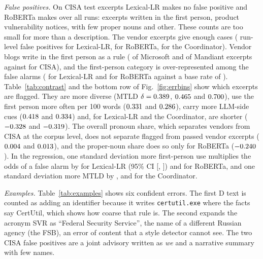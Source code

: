 \documentclass[journal]{IEEEtran}
\begin{document}
\emph{False positives.} On CISA test excerpts Lexical-LR makes no false positive and RoBERTa makes
\ErrtotalFpCisaTrans{} over all runs: \ErrNFpCisaFirstPersonTrans{} excerpts written in the first person,
\ErrNFpCisaProductVulnerabilityNoticeTrans{} product vulnerability notices, \ErrNFpCisaFewProperNounsTrans{} with
few proper nouns and \ErrNFpCisaOtherTrans{} other. These counts are too small for more than a description. The
vendor excerpts give enough cases (\ErrtotalFpVendorsLexlr{} run-level false positives for Lexical-LR,
\ErrtotalFpVendorsTrans{} for RoBERTa, \ErrtotalFpVendorsCoord{} for the Coordinator). Vendor blogs write in the
first person as a rule (\ProfpctMicrosoftFirst{} of Microsoft and \ProfpctMandiantFirst{} of Mandiant excerpts
against \ProfpctHumanFirst{} for CISA), and the first-person category is over-represented among the false alarms
(\ErrFpVendorsFirstPersonLexlr{} for Lexical-LR and \ErrFpVendorsFirstPersonTrans{} for RoBERTa against a base
rate of \ErrbaseFpVendorsFirstPerson{}). Table~\ref{tab:contrast} and the bottom row of Fig.~\ref{fig:errbins}
show which excerpts are flagged. They are more diverse (MTLD $\delta = 0.389$, $0.465$ and
$0.700$), use the first person more often per 100 words ($0.331$ and
$0.286$), carry more LLM-side cues ($0.418$ and $0.334$) and, for
Lexical-LR and the Coordinator, are shorter ($-0.328$ and $-0.319$). The overall pronoun
share, which separates vendors from CISA at the corpus level, does not separate flagged from passed vendor excerpts
($0.004$ and $0.013$), and the proper-noun share does so only for RoBERTa
($-0.240$). In the regression, one standard deviation more first-person use multiplies the odds of
a false alarm by \FpOrLexlrFirstRate{} for Lexical-LR (95\% CI [\FpOrLoLexlrFirstRate{}, \FpOrHiLexlrFirstRate{}])
and \FpOrTransFirstRate{} for RoBERTa, and one standard deviation more MTLD by \FpOrLexlrMtld{},
\FpOrTransMtld{} and \FpOrCoordMtld{} for the Coordinator.

\emph{Examples.} Table~\ref{tab:examples} shows six confident errors. The first D text is counted as adding an
identifier because it writes \texttt{certutil.exe} where the facts say CertUtil, which shows how coarse that rule
is. The second expands the acronym SVR as ``Federal Security
Service'', the name of a different Russian agency (the FSB), an error of content that a style detector cannot see.
The two CISA false positives are a joint advisory written as \emph{we} and a narrative summary with few names.
\end{document}
